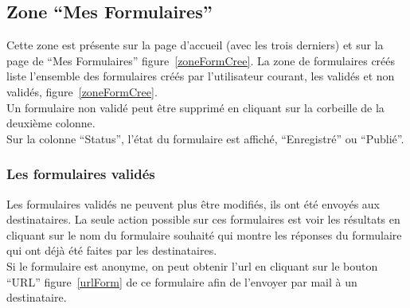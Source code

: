 \documentclass[a4paper,11pt,final]{report}
\begin{document}
\noindent\begin{minipage}{\linewidth}%
\label{barreOptions}
\end{minipage}

\subsection{Zone ``Mes Formulaires''}
Cette zone est présente sur la page d'accueil (avec les trois derniers) et sur la page de ``Mes Formulaires'' figure~\ref{zoneFormCree}. La zone de formulaires créés liste l'ensemble des formulaires créés par l'utilisateur courant, les validés et non validés, figure~\ref{zoneFormCree}.\\
Un formulaire non validé peut être supprimé en cliquant sur la corbeille de la deuxième colonne.\\
Sur la colonne ``Status'', l'état du formulaire est affiché, ``Enregistré'' ou ``Publié''.

\noindent\begin{minipage}{\linewidth}%
\label{zoneFormCree}
\end{minipage}

\subsubsection{Les formulaires validés}
Les formulaires validés ne peuvent plus être modifiés, ils ont été envoyés aux destinataires. La seule action possible sur ces formulaires est voir les résultats en cliquant sur le nom du formulaire souhaité qui montre les réponses du formulaire qui ont déjà été faites par les destinataires.\\
Si le formulaire est anonyme, on peut obtenir l'url en cliquant sur le bouton ``URL'' figure~\ref{urlForm} de ce formulaire afin de l'envoyer par mail à un destinataire.
\end{document}

